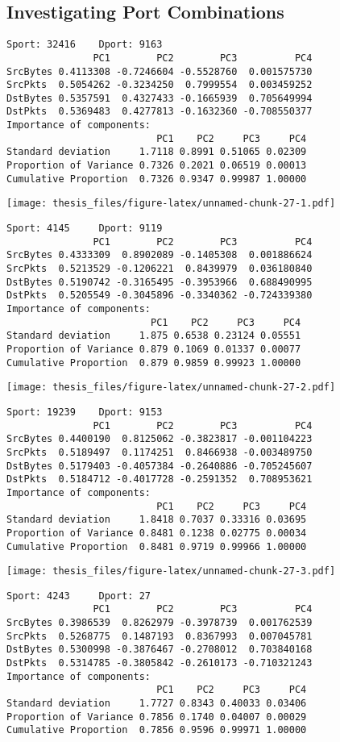 \documentclass[12pt,twoside]{dukestatscithesis}
\theoremstyle{definition}
\theoremstyle{definition}
\theoremstyle{definition}
\theoremstyle{remark}
\begin{document}
\subsection{Investigating Port
Combinations}\label{investigating-port-combinations}
\begin{verbatim}
Sport: 32416    Dport: 9163 
               PC1        PC2        PC3          PC4
SrcBytes 0.4113308 -0.7246604 -0.5528760  0.001575730
SrcPkts  0.5054262 -0.3234250  0.7999554  0.003459252
DstBytes 0.5357591  0.4327433 -0.1665939  0.705649994
DstPkts  0.5369483  0.4277813 -0.1632360 -0.708550377
Importance of components:
                          PC1    PC2     PC3     PC4
Standard deviation     1.7118 0.8991 0.51065 0.02309
Proportion of Variance 0.7326 0.2021 0.06519 0.00013
Cumulative Proportion  0.7326 0.9347 0.99987 1.00000
\end{verbatim}
\texttt{[image: thesis\_files/figure-latex/unnamed-chunk-27-1.pdf]}
\begin{verbatim}
Sport: 4145     Dport: 9119 
               PC1        PC2        PC3          PC4
SrcBytes 0.4333309  0.8902089 -0.1405308  0.001886624
SrcPkts  0.5213529 -0.1206221  0.8439979  0.036180840
DstBytes 0.5190742 -0.3165495 -0.3953966  0.688490995
DstPkts  0.5205549 -0.3045896 -0.3340362 -0.724339380
Importance of components:
                         PC1    PC2     PC3     PC4
Standard deviation     1.875 0.6538 0.23124 0.05551
Proportion of Variance 0.879 0.1069 0.01337 0.00077
Cumulative Proportion  0.879 0.9859 0.99923 1.00000
\end{verbatim}
\texttt{[image: thesis\_files/figure-latex/unnamed-chunk-27-2.pdf]}
\begin{verbatim}
Sport: 19239    Dport: 9153 
               PC1        PC2        PC3          PC4
SrcBytes 0.4400190  0.8125062 -0.3823817 -0.001104223
SrcPkts  0.5189497  0.1174251  0.8466938 -0.003489750
DstBytes 0.5179403 -0.4057384 -0.2640886 -0.705245607
DstPkts  0.5184712 -0.4017728 -0.2591352  0.708953621
Importance of components:
                          PC1    PC2     PC3     PC4
Standard deviation     1.8418 0.7037 0.33316 0.03695
Proportion of Variance 0.8481 0.1238 0.02775 0.00034
Cumulative Proportion  0.8481 0.9719 0.99966 1.00000
\end{verbatim}
\texttt{[image: thesis\_files/figure-latex/unnamed-chunk-27-3.pdf]}
\begin{verbatim}
Sport: 4243     Dport: 27 
               PC1        PC2        PC3          PC4
SrcBytes 0.3986539  0.8262979 -0.3978739  0.001762539
SrcPkts  0.5268775  0.1487193  0.8367993  0.007045781
DstBytes 0.5300998 -0.3876467 -0.2708012  0.703840168
DstPkts  0.5314785 -0.3805842 -0.2610173 -0.710321243
Importance of components:
                          PC1    PC2     PC3     PC4
Standard deviation     1.7727 0.8343 0.40033 0.03406
Proportion of Variance 0.7856 0.1740 0.04007 0.00029
Cumulative Proportion  0.7856 0.9596 0.99971 1.00000
\end{verbatim}
\end{document}
